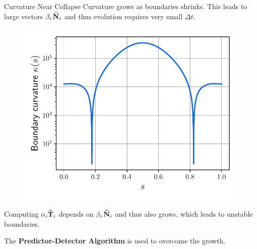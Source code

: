 \documentclass[usenames,dvipsnames]{beamer}
\begin{document}
\begin{frame}{Curvature Near Collapse}
Curvature grows as boundaries shrinks. This leads to large vectors $\beta_i\,\widehat{\mathbf{N}}_i$ and thus evolution requires very small $\Delta t$.
\vspace{-0.5em}
\begin{figure}
    \centering
    \includegraphics[scale=0.5]{figures/extras/curvature.pdf}
\end{figure}
\vspace{-1em}

Computing $\alpha_i\widehat{\mathbf{T}}_i$ depends on $\beta_i\,\widehat{\mathbf{N}}_i$ and thus also grows, which leads to unstable boundaries.%

The \textbf{Predictor-Detector Algorithm} is used to overcome the growth.
\end{frame}
\end{document}
